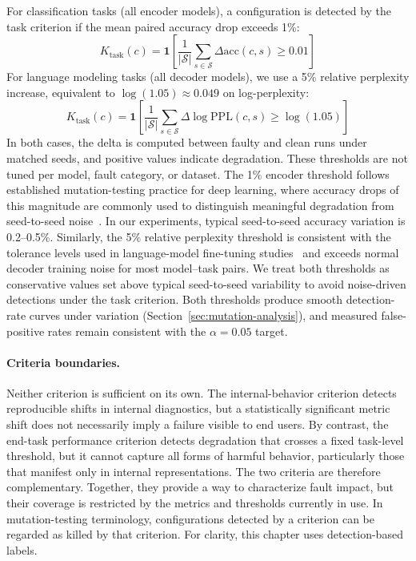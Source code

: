 For classification tasks (all encoder models), a configuration is detected by the task criterion if the mean paired accuracy drop exceeds 1\%:
\begin{equation}
K_{\text{task}}(c) = \mathbf{1}\!\left[\frac{1}{|\mathcal{S}|}\sum_{s \in \mathcal{S}} \Delta\text{acc}(c, s) \geq 0.01\right]
\label{eq:k-task-cls}
\end{equation}
For language modeling tasks (all decoder models), we use a 5\% relative perplexity increase, equivalent to $\log(1.05) \approx 0.049$ on log-perplexity:
\begin{equation}
K_{\text{task}}(c) = \mathbf{1}\!\left[\frac{1}{|\mathcal{S}|}\sum_{s \in \mathcal{S}} \Delta\log\text{PPL}(c, s) \geq \log(1.05)\right]
\label{eq:k-task-lm}
\end{equation}
In both cases, the delta is computed between faulty and clean runs under matched seeds, and positive values indicate degradation. These thresholds are not tuned per model, fault category, or dataset. The 1\% encoder threshold follows established mutation-testing practice for deep learning, where accuracy drops of this magnitude are commonly used to distinguish meaningful degradation from seed-to-seed noise~\citep{deepcrime,deepmutation++}. In our experiments, typical seed-to-seed accuracy variation is 0.2--0.5\%. Similarly, the 5\% relative perplexity threshold is consistent with the tolerance levels used in language-model fine-tuning studies~\citep{mosbach2021stability} and exceeds normal decoder training noise for most model--task pairs. We treat both thresholds as conservative values set above typical seed-to-seed variability to avoid noise-driven detections under the task criterion. Both thresholds produce smooth detection-rate curves under variation (Section~\ref{sec:mutation-analysis}), and measured false-positive rates remain consistent with the $\alpha = 0.05$ target.

\paragraph{Criteria boundaries.}
Neither criterion is sufficient on its own. The internal-behavior criterion detects reproducible shifts in internal diagnostics, but a statistically significant metric shift does not necessarily imply a failure visible to end users. By contrast, the end-task performance criterion detects degradation that crosses a fixed task-level threshold, but it cannot capture all forms of harmful behavior, particularly those that manifest only in internal representations. The two criteria are therefore complementary. Together, they provide a way to characterize fault impact, but their coverage is restricted by the metrics and thresholds currently in use. In mutation-testing terminology, configurations detected by a criterion can be regarded as killed by that criterion. For clarity, this chapter uses detection-based labels.

